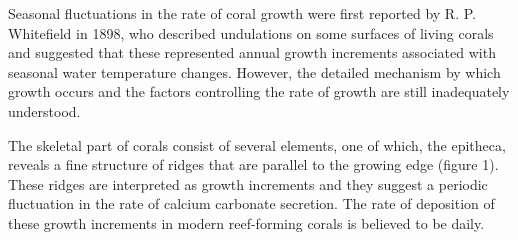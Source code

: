\documentclass[11pt]{article}
\begin{document}
Seasonal fluctuations in the rate of coral growth were first reported by R. P. Whitefield in 1898, who described undulations on some surfaces of living corals and suggested that these represented annual growth increments associated with seasonal water temperature changes. However, the detailed mechanism by which growth occurs and the factors controlling the rate of growth are still inadequately understood.

The skeletal part of corals consist of several elements, one of which, the epitheca, reveals a fine structure of ridges that are parallel to the growing edge (figure 1). These ridges are interpreted as growth increments and they suggest a periodic fluctuation in the rate of calcium carbonate secretion. The rate of deposition of these growth increments in modern reef-forming corals is believed to be daily.
\end{document}
